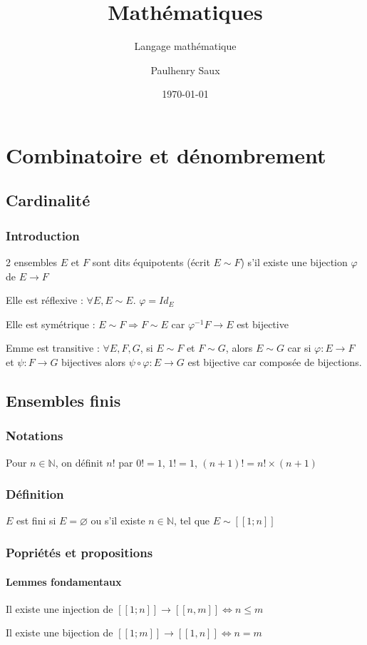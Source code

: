 \documentclass[french]{yLectureNote}
\title{Mathématiques}
\subtitle{Langage mathématique}
\author{Paulhenry Saux}
\date{\today}
\begin{document}
\setcounter{chapter}{4}

	\chapter{Combinatoire et dénombrement}
\section{Cardinalité}
\subsection{Introduction}
\begin{theorem}[Équipotence]
2 ensembles $E$ et $F$ sont dits équipotents (écrit $E\sim F$) s'il existe une bijection $\varphi$ de $E\to F$
\end{theorem}
\begin{theorem}
Elle est réflexive : $\forall E, E\sim E$. $\varphi = Id_E$

Elle est symétrique : $E\sim F \Rightarrow F\sim E$ car $\varphi^{-1} F\to E$ est bijective

Emme est transitive : $\forall E,F,G$, si $E\sim F$ et $F\sim G$, alors $E\sim G$ car si $\varphi : E\to F$ et $\psi :F\to G$ bijectives alors $\psi \circ \varphi : E\to G$ est bijective car composée de bijections.
\end{theorem}
\section{Ensembles finis}
\subsection{Notations}
Pour $n\in\mathbb{N}$, on définit $n!$ par $0!=1$, $1!=1$, $(n+1)! = n!\times (n+1)$
\subsection{Définition}
\begin{theorem}[Définition]
$E$ est fini si $E=\varnothing$ ou s'il existe $n\in\mathbb{N}$, tel que $E \sim [\![1;n]\!]$
\end{theorem}
\subsection{Popriétés et propositions}
\subsubsection{Lemmes fondamentaux}
\begin{lemma}
Il existe une injection de $ [\![1;n]\!]  \to [\![n,m]\!] \iff n\leq m$\label{injection_fini}
\end{lemma}
\begin{lemma}
Il existe une bijection de $[\![1;m]\!]  \to [\![1,n]\!] \iff n=m$\label{bijection_fini}
\end{lemma}
\end{document}
